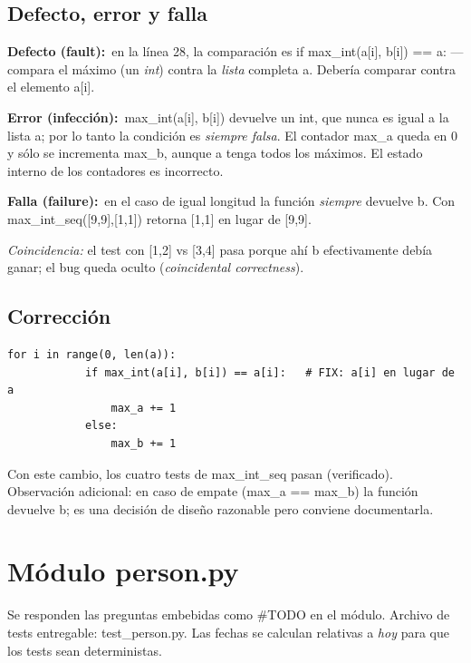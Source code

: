 \documentclass[11pt,a4paper]{article}
\newcommand{\defecto}{\textbf{\textcolor{bad}{Defecto (fault):}}\ }
\newcommand{\error}{\textbf{\textcolor{bad}{Error (infección):}}\ }
\newcommand{\falla}{\textbf{\textcolor{bad}{Falla (failure):}}\ }
\newcommand{\code}[1]{\colorbox{codebg}{\ttfamily\small #1}}
\begin{document}
\subsection{Defecto, error y falla}
\begin{def-err-fail}
\defecto en la línea 28, la comparación es
\code{if max\_int(a[i], b[i]) == a:} — compara el máximo (un \emph{int}) contra la \emph{lista} completa \code{a}.
Debería comparar contra el elemento \code{a[i]}.
\smallskip

\error \code{max\_int(a[i], b[i])} devuelve un \code{int}, que nunca es igual a la lista \code{a};
por lo tanto la condición es \emph{siempre falsa}. El contador \code{max\_a} queda en \code{0} y sólo
se incrementa \code{max\_b}, aunque \code{a} tenga todos los máximos. El estado interno de los
contadores es incorrecto.
\smallskip

\falla en el caso de igual longitud la función \emph{siempre} devuelve \code{b}. Con
\code{max\_int\_seq([9,9],[1,1])} retorna \code{[1,1]} en lugar de \code{[9,9]}.
\smallskip

\emph{Coincidencia:} el test con \code{[1,2]} vs \code{[3,4]} pasa porque ahí \code{b}
efectivamente debía ganar; el bug queda oculto (\emph{coincidental correctness}).
\end{def-err-fail}

\subsection{Corrección}
\begin{lstlisting}[style=py]
        for i in range(0, len(a)):
            if max_int(a[i], b[i]) == a[i]:   # FIX: a[i] en lugar de a
                max_a += 1
            else:
                max_b += 1
\end{lstlisting}
Con este cambio, los cuatro tests de \code{max\_int\_seq} pasan (verificado).
Observación adicional: en caso de empate (\code{max\_a == max\_b}) la función devuelve \code{b};
es una decisión de diseño razonable pero conviene documentarla.

\section{Módulo \code{person.py}}

Se responden las preguntas embebidas como \code{\#TODO} en el módulo. Archivo de tests entregable:
\code{test\_person.py}. Las fechas se calculan relativas a \emph{hoy} para que los tests sean
deterministas.
\end{document}
